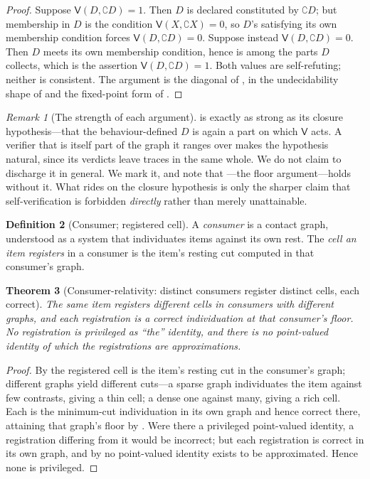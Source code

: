 \documentclass[11pt,twocolumn,a4paper]{article}
\theoremstyle{dirthm}
\newtheorem{theorem}{Theorem}[section]
\theoremstyle{definition}
\newtheorem{definition}[theorem]{Definition}
\theoremstyle{remark}
\newtheorem{remark}[theorem]{Remark}
\newcommand{\co}{\complement}
\begin{document}
\begin{proof}
Suppose $\mathsf{V}(D,\co D)=1$. Then $D$ is declared constituted by $\co D$;
but membership in $D$ is the condition $\mathsf{V}(X,\co X)=0$, so $D$'s
satisfying its own membership condition forces $\mathsf{V}(D,\co D)=0$.
Suppose instead $\mathsf{V}(D,\co D)=0$. Then $D$ meets its own membership
condition, hence is among the parts $D$ collects, which is the assertion
$\mathsf{V}(D,\co D)=1$. Both values are self-refuting; neither is consistent.
The argument is the diagonal of \citet{cantor1891}, in the undecidability
shape of \citet{godel1931,tarski1936,turing1936} and the fixed-point form of
\citet{lawvere1969}.
\end{proof}

\begin{remark}[The strength of each argument]
\label{rem:two-arguments}
 is exactly as strong as its closure
hypothesis---that the behaviour-defined $D$ is again a part on which
$\mathsf{V}$ acts. A verifier that is itself part of the graph it ranges over
makes the hypothesis natural, since its verdicts leave traces in the same
whole. We do not claim to discharge it in general. We mark it, and note that
---the floor argument---holds without it. What rides
on the closure hypothesis is only the sharper claim that self-verification is
forbidden \emph{directly} rather than merely unattainable.
\end{remark}

\begin{definition}[Consumer; registered cell]
\label{def:consumer}
A \emph{consumer} is a contact graph, understood as a system that
individuates items against its own rest. The \emph{cell an item registers}
in a consumer is the item's resting cut computed in that consumer's graph.
\end{definition}

\begin{theorem}[Consumer-relativity: distinct consumers register distinct
cells, each correct]
\label{thm:receiver}
The same item registers different cells in consumers with different graphs,
and each registration is a correct individuation at that consumer's floor. No
registration is privileged as ``the'' identity, and there is no point-valued
identity of which the registrations are approximations.
\end{theorem}

\begin{proof}
By  the registered cell is the item's resting cut in the
consumer's graph; different graphs yield different cuts---a sparse graph
individuates the item against few contrasts, giving a thin cell; a dense one
against many, giving a rich cell. Each is the minimum-cut individuation in
its own graph and hence correct there, attaining that graph's floor by
. Were there a privileged point-valued identity, a
registration differing from it would be incorrect; but each registration is
correct in its own graph, and by  no point-valued
identity exists to be approximated. Hence none is privileged.
\end{proof}
\end{document}
